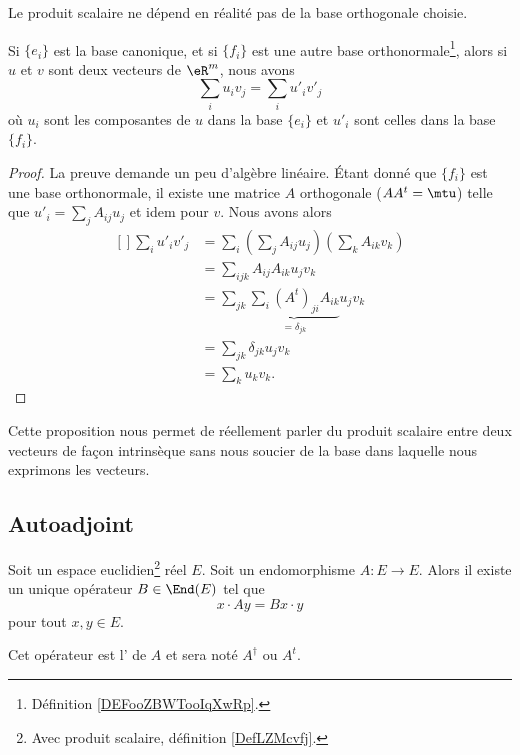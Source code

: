Le produit scalaire ne dépend en réalité pas de la base orthogonale choisie.

\begin{lemma}       \label{LEMooZMCWooDfbrIq}
	Si \( \{ e_i \}\) est la base canonique, et si \( \{ f_i \}\) est une autre base orthonormale\footnote{Définition \ref{DEFooZBWTooIqXwRp}.}, alors si \( u\) et \( v\) sont deux vecteurs de \( \eR^m\), nous avons
	\begin{equation}
		\sum_i u_iv_j=\sum_iu'_iv'_j
	\end{equation}
	où \( u_i\) sont les composantes de \( u\) dans la base \( \{ e_i \}\) et \( u'_i\) sont celles dans la base \( \{ f_i \}\).
\end{lemma}

\begin{proof}
	La preuve demande un peu d'algèbre linéaire. Étant donné que \( \{ f_i \}\) est une base orthonormale, il existe une matrice \( A\) orthogonale (\( AA^t=\mtu\)) telle que \( u'_i=\sum_jA_{ij}u_j\) et idem pour \( v\). Nous avons alors
	\begin{equation}
		\begin{aligned}[]
			\sum_iu'_iv'_j & =\sum_i\left( \sum_jA_{ij} u_j\right)\left( \sum_k A_{ik}v_k \right) \\
			               & =\sum_{ijk}A_{ij}A_{ik}u_jv_k                                        \\
			               & =\sum_{jk}\underbrace{\sum_i(A^t)_{ji}A_{ik}}_{=\delta_{jk}}u_jv_k   \\
			               & =\sum_{jk}\delta_{jk}u_jv_k                                          \\
			               & =\sum_ku_kv_k.
		\end{aligned}
	\end{equation}
\end{proof}

Cette proposition nous permet de réellement parler du produit scalaire entre deux vecteurs de façon intrinsèque sans nous soucier de la base dans laquelle nous exprimons les vecteurs.

\subsection{Autoadjoint}

\begin{proposition}	\label{PROPooYCSWooBnVwFv}
	Soit un espace euclidien\footnote{Avec produit scalaire, définition \ref{DefLZMcvfj}.} réel \( E\). Soit un endomorphisme \(A \colon E\to E  \). Alors il existe un unique opérateur \( B\in \End(E)\) tel que
	\begin{equation}
		x\cdot Ay=Bx\cdot y
	\end{equation}
	pour tout \( x,y\in E\).

	Cet opérateur est l' de \( A\) et sera noté \( A^{\dag}\) ou \( A^t\).
\end{proposition}

